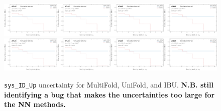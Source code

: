 \begin{figure}[h!]
\includegraphics[width=0.25\textwidth,page=129]{figures/SimResults/Lepton_SystEffect.pdf}\includegraphics[width=0.25\textwidth,page=137]{figures/SimResults/Lepton_SystEffect.pdf}\includegraphics[width=0.25\textwidth,page=145]{figures/SimResults/Lepton_SystEffect.pdf}\includegraphics[width=0.25\textwidth,page=153]{figures/SimResults/Lepton_SystEffect.pdf}\\
\includegraphics[width=0.25\textwidth,page=161]{figures/SimResults/Lepton_SystEffect.pdf}\includegraphics[width=0.25\textwidth,page=169]{figures/SimResults/Lepton_SystEffect.pdf}\includegraphics[width=0.25\textwidth,page=177]{figures/SimResults/Lepton_SystEffect.pdf}\includegraphics[width=0.25\textwidth,page=185]{figures/SimResults/Lepton_SystEffect.pdf}
\caption{\texttt{sys\_ID\_Up} uncertainty for MultiFold, UniFold, and IBU.  \textbf{N.B. still identifying a bug that makes the uncertainties too large for the NN methods.}}
\label{fig:simresultsmulti_Leptonuncertsl1}
\end{figure}

